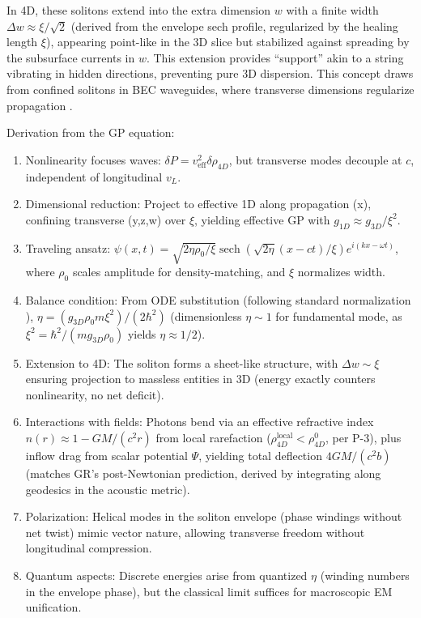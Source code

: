 \documentclass{article}
\DeclareMathOperator{\sech}{sech}
\begin{document}
In 4D, these solitons extend into the extra dimension $w$ with a finite width $\Delta w \approx \xi / \sqrt{2}$ (derived from the envelope sech profile, regularized by the healing length $\xi$), appearing point-like in the 3D slice but stabilized against spreading by the subsurface currents in $w$. This extension provides ``support'' akin to a string vibrating in hidden directions, preventing pure 3D dispersion. This concept draws from confined solitons in BEC waveguides, where transverse dimensions regularize propagation \cite{becker2008oscillations}.

Derivation from the GP equation:
\begin{enumerate}
    \item Nonlinearity focuses waves: $\delta P = v_{\text{eff}}^2 \delta \rho_{4D}$, but transverse modes decouple at $c$, independent of longitudinal $v_L$.
    \item Dimensional reduction: Project to effective 1D along propagation (x), confining transverse (y,z,w) over $\xi$, yielding effective GP with $g_{1D} \approx g_{3D}/\xi^2$.
    \item Traveling ansatz: $\psi(x,t) = \sqrt{2 \eta \rho_0 / \xi} \sech\left( \sqrt{2 \eta} (x - c t)/ \xi \right) e^{i (k x - \omega t)}$, where $\rho_0$ scales amplitude for density-matching, and $\xi$ normalizes width.
    \item Balance condition: From ODE substitution (following standard normalization \cite{pitaevskii2016bose}), $\eta = (g_{3D} \rho_0 m \xi^2)/(2\hbar^2)$ (dimensionless $\eta \sim 1$ for fundamental mode, as $\xi^2 = \hbar^2 / (m g_{3D} \rho_0)$ yields $\eta \approx 1/2$).
    \item Extension to 4D: The soliton forms a sheet-like structure, with $\Delta w \sim \xi$ ensuring projection to massless entities in 3D (energy exactly counters nonlinearity, no net deficit).
    \item Interactions with fields: Photons bend via an effective refractive index $n(r) \approx 1 - G M / (c^2 r)$ from local rarefaction ($\rho_{4D}^{\text{local}} < \rho_{4D}^0$, per P-3), plus inflow drag from scalar potential $\Psi$, yielding total deflection $4 G M / (c^2 b)$ (matches GR's post-Newtonian prediction, derived by integrating along geodesics in the acoustic metric).
    \item Polarization: Helical modes in the soliton envelope (phase windings without net twist) mimic vector nature, allowing transverse freedom without longitudinal compression.
    \item Quantum aspects: Discrete energies arise from quantized $\eta$ (winding numbers in the envelope phase), but the classical limit suffices for macroscopic EM unification.
\end{enumerate}
\end{document}
